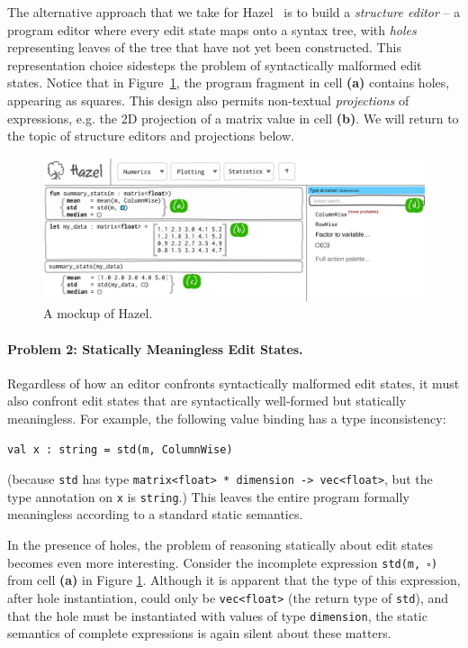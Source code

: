 \documentclass[letterpaper,USenglish]{lipics-v2016}
\let\li\lstinline
\newcommand{\Hazel}[0]{\textsf{Hazel}}
\newcommand{\HazelEnv}[0]{\Hazel}
\begin{document}
The alternative approach that we take for \HazelEnv~ is to build a
\emph{structure editor} -- a program editor where every edit state
maps onto a syntax tree, with \emph{holes} representing leaves of the tree
that have not yet been constructed.  This representation choice sidesteps the
problem of syntactically malformed edit states. Notice that in
Figure~\ref{fig:hazel-mockup}, the program fragment in cell
\textbf{(a)} contains holes, appearing as squares. This design also permits
non-textual \emph{projections} of expressions, e.g. 
the 2D projection of a matrix value in cell \textbf{(b)}.
We will return to the topic of structure editors and projections below.


\begin{figure}
\includegraphics[width=1.025\textwidth]{mockup-1}
\caption{A mockup of \HazelEnv.}
\label{fig:hazel-mockup}
\end{figure}

\paragraph{Problem 2: Statically Meaningless Edit States.} Regardless of how an 
editor confronts syntactically malformed edit states, it must also confront 
edit states that are syntactically well-formed but statically meaningless. For
example, the following value binding has a type inconsistency:
\begin{lstlisting}[numbers=none]
val x : string = std(m, ColumnWise)
\end{lstlisting}
(because \li{std} has type \li{matrix<float> * dimension -> vec<float>},
but the type annotation on \li{x} is \li{string}.) This leaves the entire program
formally meaningless according to a standard static semantics.

In the presence of holes, the problem of reasoning statically about edit states
becomes even more interesting.  Consider the incomplete expression \texttt{std(m,~$\square$)} 
from cell \textbf{(a)} in Figure \ref{fig:hazel-mockup}.
%
%
Although it is apparent that the type of this expression, after hole instantiation, could only be \lstinline{vec<float>} (the return type of \lstinline{std}),
and that the hole must be instantiated with values of type \li{dimension}, the static
semantics of complete expressions is again silent about these matters. 
\end{document}
